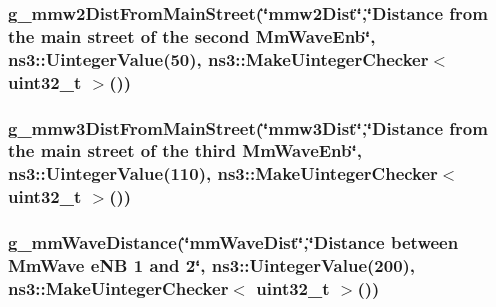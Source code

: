 \subsubsection[{\texorpdfstring{g\+\_\+mmw2\+Dist\+From\+Main\+Street}{g_mmw2DistFromMainStreet}}]{ g\+\_\+mmw2\+Dist\+From\+Main\+Street(\char`\"{}mmw2\+Dist\char`\"{},\char`\"{}Distance {\bf from} the {\bf main} street of the second Mm\+Wave\+Enb\char`\"{}, ns3\+::\+Uinteger\+Value(50), {\bf ns3\+::\+Make\+Uinteger\+Checker}$<$ uint32\+\_\+t $>$())\hspace{0.3cm}{\ttfamily [static]}}\hypertarget{mc-twoenbs_8cc_a55e05eacdfb95abe95fbcc91e8c21443}{}\label{mc-twoenbs_8cc_a55e05eacdfb95abe95fbcc91e8c21443}
\subsubsection[{\texorpdfstring{g\+\_\+mmw3\+Dist\+From\+Main\+Street}{g_mmw3DistFromMainStreet}}]{ g\+\_\+mmw3\+Dist\+From\+Main\+Street(\char`\"{}mmw3\+Dist\char`\"{},\char`\"{}Distance {\bf from} the {\bf main} street of the third Mm\+Wave\+Enb\char`\"{}, ns3\+::\+Uinteger\+Value(110), {\bf ns3\+::\+Make\+Uinteger\+Checker}$<$ uint32\+\_\+t $>$())\hspace{0.3cm}{\ttfamily [static]}}\hypertarget{mc-twoenbs_8cc_a57e450db8750b692f410266a45ba6b03}{}\label{mc-twoenbs_8cc_a57e450db8750b692f410266a45ba6b03}
\subsubsection[{\texorpdfstring{g\+\_\+mm\+Wave\+Distance}{g_mmWaveDistance}}]{ g\+\_\+mm\+Wave\+Distance(\char`\"{}mm\+Wave\+Dist\char`\"{},\char`\"{}Distance between Mm\+Wave e\+NB 1 and 2\char`\"{}, ns3\+::\+Uinteger\+Value(200), {\bf ns3\+::\+Make\+Uinteger\+Checker}$<$ uint32\+\_\+t $>$())\hspace{0.3cm}{\ttfamily [static]}}\hypertarget{mc-twoenbs_8cc_aa09a9312753e1b81f60df6c1886f595f}{}\label{mc-twoenbs_8cc_aa09a9312753e1b81f60df6c1886f595f}
